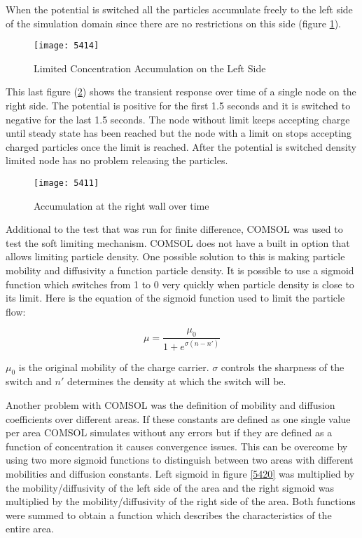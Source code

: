 When the potential is switched all the particles accumulate freely to the left side of the simulation domain since there are no restrictions on this side (figure \ref{5414}).
\begin{figure}[!htp]
\centering
\texttt{[image: 5414]}
\caption{Limited Concentration Accumulation on the Left Side} 
\label{5414}
\end{figure}

This last figure (\ref{5411}) shows the transient response  over time of a single node on the right side. The potential is positive for the first 1.5 seconds and it is switched to negative for the last 1.5 seconds. The node without limit keeps accepting charge until steady state has been reached but the node with a limit on stops accepting charged particles once the limit is reached. After the potential is switched density limited node has no problem releasing the particles.


\begin{figure}[!htp]
\centering
\texttt{[image: 5411]}
\caption{Accumulation at the right wall over time} 
\label{5411}
\end{figure}

Additional to the test that was run for finite difference, COMSOL was used to test the soft limiting mechanism. COMSOL does not have a built in option that allows limiting particle density. One possible solution to this is making particle mobility and diffusivity a function particle density. It is possible to use a sigmoid function which switches from 1 to 0 very quickly when particle density is close to its limit. Here is the equation of the sigmoid function used to limit the particle flow:

\begin{equation}
\mu = \frac{\mu_{0}}{1+e^{\sigma(n-n')}}
\label{mur}
\end{equation} 

$\mu_0$ is the original mobility of the charge carrier. $\sigma$ controls the sharpness of the switch and $n'$ determines the density at which the switch will be. 

Another problem with COMSOL was the definition of mobility and diffusion coefficients over different areas. If these constants are defined as one single value per area COMSOL simulates without any errors but if they are defined as a function of concentration it causes convergence issues. This can be overcome by using two more sigmoid functions to distinguish between two areas with different mobilities and diffusion constants. Left sigmoid in figure \ref{5420}  was multiplied by the mobility/diffusivity of the left side of the area and the right sigmoid was multiplied by the mobility/diffusivity of the right side of the area. Both functions were summed to obtain a function which describes the characteristics of the entire area.

